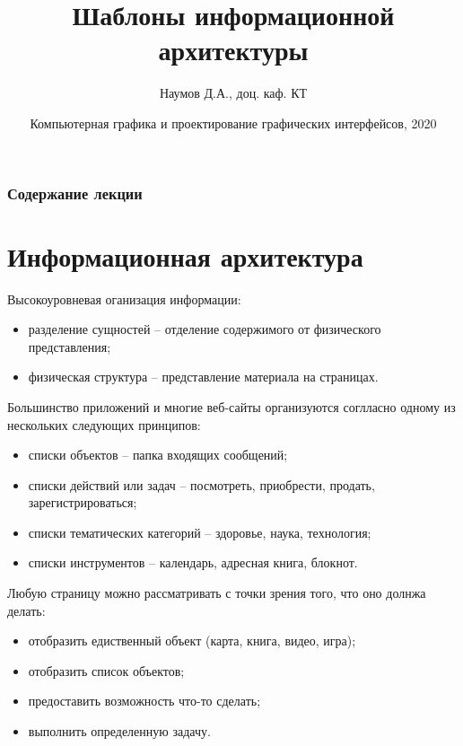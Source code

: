 \documentclass{beamer}
\title[Шаблоны]{Шаблоны информационной архитектуры}
\author{Наумов Д.А., доц. каф. КТ}
\date[18.11.2020] {Компьютерная графика и проектирование графических интерфейсов, 2020}
\begin{document}
\begin{frame}
  \titlepage
\end{frame}
  
\begin{frame}
  \frametitle{Содержание лекции}
  \tableofcontents  
\end{frame}

\section{Информационная архитектура}

\begin{frame}[t]
	Высокоуровневая оганизация информации:
	\begin{itemize}
		\item разделение сущностей -- отделение содержимого от физического представления;
		\item физическая структура -- представление материала на страницах.
	\end{itemize}
	
	Большинство приложений и многие веб-сайты организуются соглласно одному из нескольких следующих принципов:
	\begin{itemize}
		\item списки объектов -- папка входящих сообщений;
		\item списки действий или задач -- посмотреть, приобрести, продать, зарегистрироваться; 		
		\item списки тематических категорий -- здоровье, наука, технология;		
		\item списки инструментов -- календарь, адресная книга, блокнот.		
	\end{itemize}
	
	Любую страницу можно рассматривать с точки зрения того, что оно долнжа делать:
	\begin{itemize}
		\item отобразить едиственный объект (карта, книга, видео, игра);
		\item отобразить список объектов;
		\item предоставить возможность что-то сделать;
		\item выполнить определенную задачу.				
	\end{itemize}	

\end{frame} 
\end{document}
